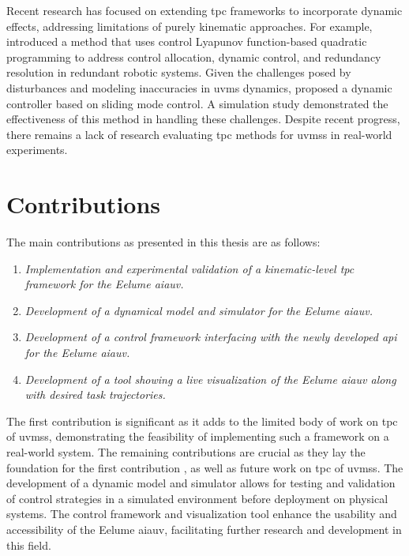 Recent research has focused on extending \gls{tpc} frameworks to incorporate
dynamic effects, addressing limitations of purely kinematic approaches.
For example, \cite{basso2020} introduced a method that uses control 
Lyapunov function-based quadratic programming to address control allocation, 
dynamic control, and redundancy resolution in redundant robotic systems. Given 
the challenges posed by disturbances and modeling inaccuracies in \gls{uvms} 
dynamics, \cite{iversflaten2022} proposed a dynamic controller based on sliding 
mode control. A simulation study demonstrated the effectiveness of this method 
in handling these challenges.
Despite recent progress, there remains a lack of research evaluating \gls{tpc}
methods for \gls{uvms}s in real-world experiments.

\section{Contributions}

The main contributions as presented in this thesis are as follows:
\begin{enumerate}
    \item \emph{Implementation and experimental validation of a kinematic-level \gls{tpc} framework for the Eelume \gls{aiauv}.}
    \item \emph{Development of a dynamical model and simulator for the Eelume \gls{aiauv}.}
    \item \emph{Development of a control framework interfacing with the newly developed \gls{api} for the Eelume \gls{aiauv}.}
    \item \emph{Development of a tool showing a live visualization of the Eelume \gls{aiauv} along with desired task trajectories.}
\end{enumerate}

The first contribution is significant as it adds to the limited body of work 
on \gls{tpc} of \glspl{uvms}, demonstrating the feasibility of 
implementing such a framework on a real-world system. The remaining 
contributions are crucial as they lay the foundation for the first contribution
, as well as future work on \gls{tpc} of \glspl{uvms}. The 
development of a dynamic model and simulator allows for testing and validation 
of control strategies in a simulated environment before deployment on physical 
systems. The control framework and visualization tool enhance the usability 
and accessibility of the Eelume \gls{aiauv}, facilitating further research and 
development in this field.

